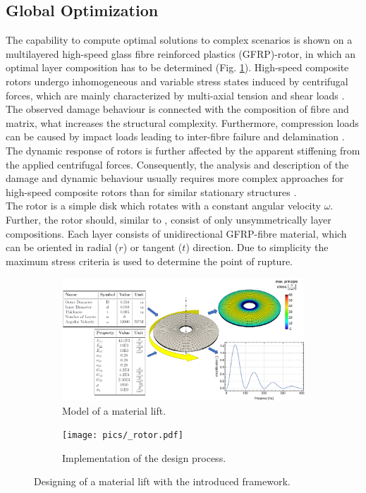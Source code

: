 \subsection{Global Optimization}
The capability to compute optimal solutions to complex scenarios is shown 
on a multilayered high-speed glass fibre reinforced plastics (GFRP)-rotor,
in which an optimal layer composition has to be determined (Fig. \ref{pic:rotor_model}).
High-speed composite rotors undergo inhomogeneous and variable stress states induced
by centrifugal forces, which are mainly characterized by multi-axial tension and shear
loads \cite{filippatos_damage_2017}.
The observed damage behaviour is connected with the composition of fibre and matrix, 
what increases the structural complexity.
Furthermore, compression loads can be caused by impact loads leading to 
inter-fibre failure and delamination \cite{Boehm2010, Thieme2014, Hufenbach2006}.
The dynamic response of rotors is further affected by the apparent stiffening from
the applied centrifugal forces. 
Consequently, the analysis and description of the damage
and dynamic behaviour usually requires more complex approaches for high-speed composite
rotors than for similar stationary structures \cite{filippatos_damage_2017}.\\
The rotor is a simple disk which rotates with a constant angular velocity $\omega$.
Further, the rotor should, similar to \cite{Filippatos2021}, consist of only unsymmetrically layer compositions.
Each layer consists of unidirectional GFRP-fibre material,
which can be oriented in radial ($r$) or tangent ($t$) direction.
Due to simplicity the maximum stress criteria is used to determine the point of rupture.
\begin{figure}[h]
    \centering
    \begin{subfigure}[b]{0.85\textwidth}
        \centering
        \includegraphics[width=\textwidth]{pics/rotor_model.png}
        \caption{\label{pic:rotor_model} Model of a material lift.}
    \end{subfigure}
    \hfill
    \begin{subfigure}[b]{0.95\textwidth}
        \centering
        \texttt{[image: pics/\_rotor.pdf]}
        \caption{\label{pic:rotor_solution} Implementation of the design process.}
    \end{subfigure}
    \caption{\label{pic:rotor} Designing of a material lift with the introduced framework.}
\end{figure}\\

